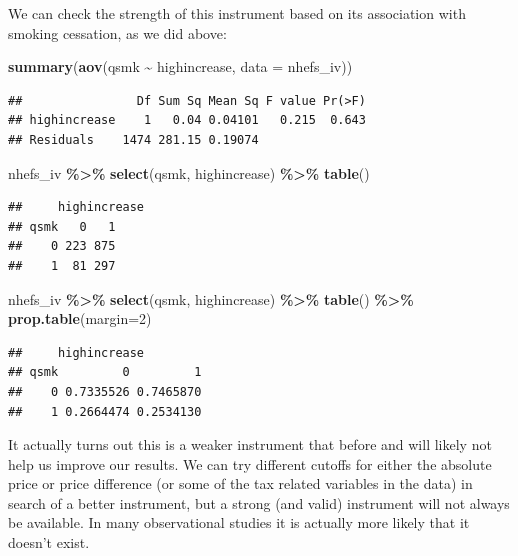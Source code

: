 \documentclass[
]{book}
\newenvironment{Shaded}{\begin{snugshade}}{\end{snugshade}}
\newcommand{\AttributeTok}[1]{\textcolor[rgb]{0.13,0.29,0.53}{#1}}
\newcommand{\DecValTok}[1]{\textcolor[rgb]{0.00,0.00,0.81}{#1}}
\newcommand{\FunctionTok}[1]{\textcolor[rgb]{0.13,0.29,0.53}{\textbf{#1}}}
\newcommand{\NormalTok}[1]{#1}
\newcommand{\SpecialCharTok}[1]{\textcolor[rgb]{0.81,0.36,0.00}{\textbf{#1}}}
\begin{document}
We can check the strength of this instrument based on its association with smoking cessation, as we did above:

\begin{Shaded}
\begin{Highlighting}[]
\FunctionTok{summary}\NormalTok{(}\FunctionTok{aov}\NormalTok{(qsmk }\SpecialCharTok{\textasciitilde{}}\NormalTok{ highincrease, }\AttributeTok{data =}\NormalTok{ nhefs\_iv))}
\end{Highlighting}
\end{Shaded}

\begin{verbatim}
##                Df Sum Sq Mean Sq F value Pr(>F)
## highincrease    1   0.04 0.04101   0.215  0.643
## Residuals    1474 281.15 0.19074
\end{verbatim}

\begin{Shaded}
\begin{Highlighting}[]
\NormalTok{nhefs\_iv }\SpecialCharTok{\%\textgreater{}\%} 
  \FunctionTok{select}\NormalTok{(qsmk, highincrease) }\SpecialCharTok{\%\textgreater{}\%} 
  \FunctionTok{table}\NormalTok{()}
\end{Highlighting}
\end{Shaded}

\begin{verbatim}
##     highincrease
## qsmk   0   1
##    0 223 875
##    1  81 297
\end{verbatim}

\begin{Shaded}
\begin{Highlighting}[]
\NormalTok{nhefs\_iv }\SpecialCharTok{\%\textgreater{}\%} 
  \FunctionTok{select}\NormalTok{(qsmk, highincrease) }\SpecialCharTok{\%\textgreater{}\%} 
  \FunctionTok{table}\NormalTok{() }\SpecialCharTok{\%\textgreater{}\%} 
  \FunctionTok{prop.table}\NormalTok{(}\AttributeTok{margin=}\DecValTok{2}\NormalTok{)}
\end{Highlighting}
\end{Shaded}

\begin{verbatim}
##     highincrease
## qsmk         0         1
##    0 0.7335526 0.7465870
##    1 0.2664474 0.2534130
\end{verbatim}

It actually turns out this is a weaker instrument that before and will likely not help us improve our results. We can try different cutoffs for either the absolute price or price difference (or some of the tax related variables in the data) in search of a better instrument, but a strong (and valid) instrument will not always be available. In many observational studies it is actually more likely that it doesn't exist.
\end{document}

